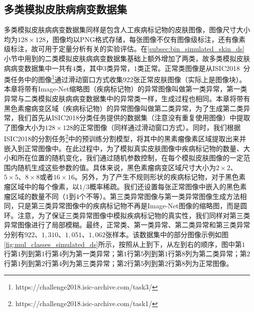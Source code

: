 \subsection{多类模拟皮肤病病变数据集}
多类模拟皮肤病病变数据集同样是包含人工疾病标记物的皮肤图像，图像尺寸大小均为$128\times 128$，图像均以PNG格式存储，每张图像不仅有图像级标注，还有像素级标注，故可用于定量分析有关的实验评估。在\ref{subsec:bin_simulated_skin_ds}小节中用到的二类模拟皮肤病病变数据集基础上额外增加了两类，故多类模拟皮肤病病变数据集中一共有$4$类，其中$3$类异常，$1$类正常。正常类图像是从ISIC2018~\cite{codella2019skin, tschandl2018ham10000}分类任务中的图像\footnote{https://challenge2018.isic-archive.com/task3/}通过滑动窗口方式收集$922$张正常皮肤图像（实际上是图像块）。本章将带有Image-Net缩略图（疾病标记物）的异常图像叫做第一类异常，第一类异常与二类模拟皮肤病病变数据集中的异常类一样，生成过程也相同。本章将带有黑色素瘤病变区域（疾病标记物）的异常图像叫做第二类异常，为了生成第二类异常，我们首先从ISIC2018分类任务提供的数据集（注意没有重复使用图像）中提取了图像大小为$128\times 128$的正常图像（同样通过滑动窗口方式）。同时，我们根据ISIC2018的分割任务\footnote{https://challenge2018.isic-archive.com/task1/}中的预训练分割模型，将其中的黑素瘤像素区域提取出来并嵌入到正常图像中。在此过程中，为了模拟真实皮肤图像中疾病标记物的数量、大小和所在位置的随机变化，我们通过随机参数控制，在每个模拟皮肤图像的一定范围内随机生成这些参数的值。具体来说，黑色素瘤病变区域尺寸大小为$2\times 2$、$5\times 5$、$8\times 8$或者$16\times 16$。另外，为了产生不规则形状的疾病标记物，对于黑色素瘤区域中的每个像素，以$1/3$概率稀疏。我们还设置每张正常图像中嵌入的黑色素瘤区域的数量不同（$1$到$4$个不等）。第三类异常图像与第一类异常图像生成方法相同，只是第三类异常图像中的疾病标记物不再是Image-Net图像的缩略图，而是圆环。注意，为了保证三类异常图像中模拟疾病标记物的真实性，我们同样对第三类异常图像进行了局部模糊。最终，正常类、第一类异常、第二类异常和第三类异常分别有$922$、$1,310$、$1,051$、$1,062$张样本。该数据集中的部分图像示例如图\ref{fig:mul_classes_simulated_ds}所示，按照从上到下，从左到右的顺序，图中第$1$行第$1$列到第$1$行第$4$列为第一类异常；第$1$行第$5$列到第$1$行第$8$列为第二类异常；第$2$行第$1$列到第$2$行第$4$列为第三类异常；第$2$行第$5$列到第$2$行第$8$列为正常图像。
